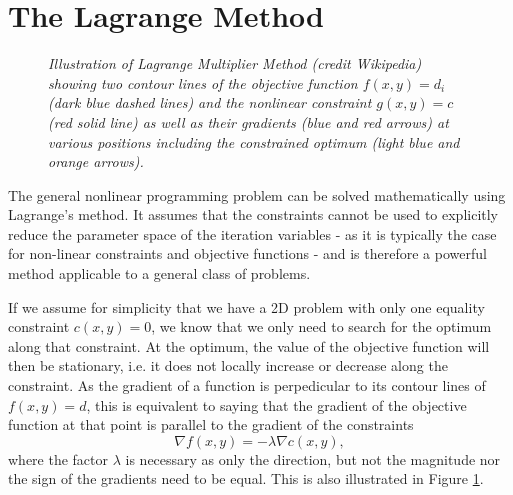 \documentclass[11pt,a4paper]{report}
\begin{document}
\section{The Lagrange Method}
\label{sec:Lagrange}

\begin{figure}[tbph]
\caption[Illustration of Lagrange multiplier method]
{\label{fig:LagrangeMultipliers} \textit{Illustration of Lagrange Multiplier
    Method (credit Wikipedia) showing two contour lines of the objective
    function $f(x,y) = d_i$ (dark blue dashed lines) and the nonlinear
    constraint $g(x,y)=c$ (red solid line) as well as their gradients (blue
    and red arrows) at various positions including the constrained optimum
    (light blue and orange arrows).}
}
\end{figure}

The general nonlinear programming problem can be solved mathematically using
Lagrange's method. It assumes that the constraints cannot be used to
explicitly reduce the parameter space of the iteration variables - as it is
typically the case for non-linear constraints and objective functions - and is
therefore a powerful method applicable to a general class of problems.

If we assume for simplicity that we have a 2D problem with only one equality
constraint $c(x,y) = 0$, we know that we only need to search for the optimum
along that constraint. At the optimum, the value of the objective function
will then be stationary, i.e. it does not locally increase or decrease along
the constraint. As the gradient of a function is perpedicular to its contour
lines of $f(x,y) =d$, this is equivalent to saying that the gradient of the
objective function at that point is parallel to the gradient of the
constraints
\begin{equation}
\label{eqn:lagrangeequality}
\nabla f(x,y) = - \lambda \nabla c(x,y),
\end{equation}
where the factor $\lambda$ is necessary as only the direction, but not the
magnitude nor the sign of the gradients need to be equal. This is also
illustrated in Figure \ref{fig:LagrangeMultipliers}.
\end{document}
